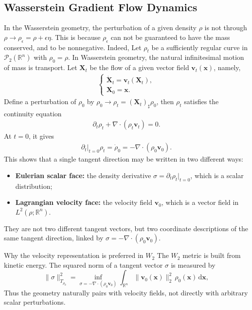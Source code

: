 \documentclass[11pt]{book}
\newcommand{\R}{\mathbb{R}}
\newcommand{\bx}{\mathbf x}
\newcommand{\bX}{\mathbf X}
\newcommand{\bv}{\mathbf v}
\newcommand{\Ptwo}{\mathcal{P}_2(\mathbb{R}^n)}
\newcommand{\dd}{\mathrm{d}}
\begin{document}
\subsection{Wasserstein Gradient Flow Dynamics}


In the Wasserstein geometry, the perturbation of a given density $\rho$ is not through $\rho \rightarrow \rho_{\epsilon} = \rho + \epsilon \eta$. This is because $\rho_{\epsilon}$ can not be guaranteed to have the mass conserved, and to be nonnegative. Indeed, Let $\rho_t$ be a sufficiently regular curve in $\Ptwo$ with $\rho_0=\rho$. In Wasserstein geometry, the natural infinitesimal motion of mass is transport. Let $\bX_t$ be the flow of a given vector field $\bv_t(\bx)$, namely, 
\begin{align}
    \begin{cases}
        \dot{\mathbf{X}}_t = \bv_t(\mathbf{X}_t), \\
        \mathbf{X}_0 = \mathbf{x}.
    \end{cases}
\end{align}
Define a perturbation of $\rho_0$ by $\rho_0 \rightarrow \rho_t = (\bX_t)_{\sharp}\rho_0$, then $\rho_t$ satisfies the continuity equation
\begin{align*}
    \partial_t \rho_t + \nabla \cdot (\rho_t \bv_t) = 0.
\end{align*}
At $t=0$, it gives  
\begin{align}\label{eqn:twofaces_identity}
    \partial_t|_{t=0}\rho_t = \dot{\rho}_0 = - \nabla \cdot(\rho_0\bv_0).
\end{align}
This shows that a single tangent direction may be written in two different ways:
\begin{itemize}
  \item \textbf{Eulerian scalar face:} the density derivative $\sigma = \partial_t\rho_t|_{t=0}$, which is a scalar distribution;
  \item \textbf{Lagrangian velocity face:} the velocity field $\bv_0$, which is a vector field in $L^2(\rho;\R^n)$.
\end{itemize}
They are not two different tangent vectors, but two coordinate descriptions of the same tangent direction, linked by $\sigma = -\nabla\cdot(\rho_0\bv_0)$.

\begin{keybox}{Why the velocity representation is preferred in $W_2$}
The $W_2$ metric is built from kinetic energy. The squared norm of a tangent vector $\sigma$ is measured by
\[
\|\sigma\|_{T_{\rho_0}}^2 = \inf_{\sigma = -\nabla\cdot(\rho_0\bv_0)}\int_{\R^n} \|\bv_0(\bx)\|_2^2\,\rho_0(\bx)\,\dd \bx,
\]
Thus the geometry naturally pairs with velocity fields, not directly with arbitrary scalar perturbations.
\end{keybox}
\end{document}
